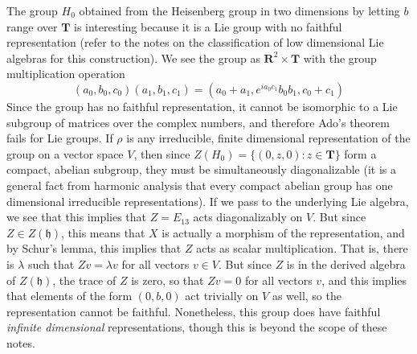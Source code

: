 \begin{example}
    The group $H_0$ obtained from the Heisenberg group in two dimensions by letting $b$ range over $\mathbf{T}$ is interesting because it is a Lie group with no faithful representation (refer to the notes on the classification of low dimensional Lie algebras for this construction). We see the group as $\mathbf{R}^2 \times \mathbf{T}$ with the group multiplication operation
    \[ (a_0,b_0,c_0)(a_1,b_1,c_1) = (a_0 + a_1, e^{ia_0c_1}b_0b_1, c_0 + c_1) \]
    Since the group has no faithful representation, it cannot be isomorphic to a Lie subgroup of matrices over the complex numbers, and therefore Ado's theorem fails for Lie groups. If $\rho$ is any irreducible, finite dimensional representation of the group on a vector space $V$, then since $Z(H_0) = \{ (0,z,0): z \in \mathbf{T} \}$ form a compact, abelian subgroup, they must be simultaneously diagonalizable (it is a general fact from harmonic analysis that every compact abelian group has one dimensional irreducible representations). If we pass to the underlying Lie algebra, we see that this implies that $Z = E_{13}$ acts diagonalizably on $V$. But since $Z \in Z(\mathfrak{h})$, this means that $X$ is actually a morphism of the representation, and by Schur's lemma, this implies that $Z$ acts as scalar multiplication. That is, there is $\lambda$ such that $Zv = \lambda v$ for all vectors $v \in V$. But since $Z$ is in the derived algebra of $Z(\mathfrak{h})$, the trace of $Z$ is zero, so that $Zv = 0$ for all vectors $v$, and this implies that elements of the form $(0,b,0)$ act trivially on $V$ as well, so the representation cannot be faithful. Nonetheless, this group does have faithful {\it infinite dimensional} representations, though this is beyond the scope of these notes.


\end{example}
